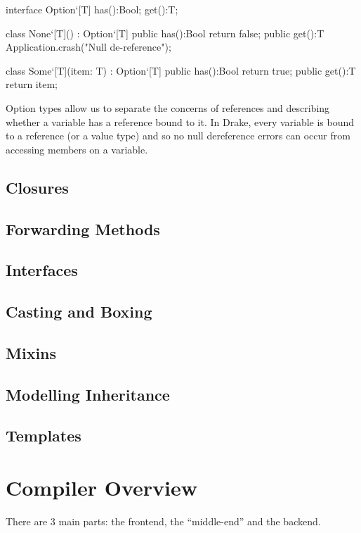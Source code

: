 \documentclass{article}
\newcommand{\plname}[0]{Drake\xspace}
\begin{document}
\begin{sooplisting}
interface Option`[T] {
	has():Bool;
	get():T;
}

class None`[T]() : Option`[T] {
	public has():Bool { return false; }
	public get():T    { Application.crash("Null de-reference"); }
}

class Some`[T](item: T) : Option`[T] {
	public has():Bool { return true; }
	public get():T    { return item; }
}
\end{sooplisting}
Option types allow us to separate the concerns of references and describing whether a variable has a reference bound to it. In \plname, every variable is bound to a reference (or a value type) and so no null dereference errors can occur from accessing members on a variable.

\subsection{Closures}

\subsection{Forwarding Methods}

\subsection{Interfaces}

\subsection{Casting and Boxing}

\subsection{Mixins}

\subsection{Modelling Inheritance}

\subsection{Templates}

\section{Compiler Overview}
There are 3 main parts: the frontend, the ``middle-end'' and the backend. 
\end{document}
